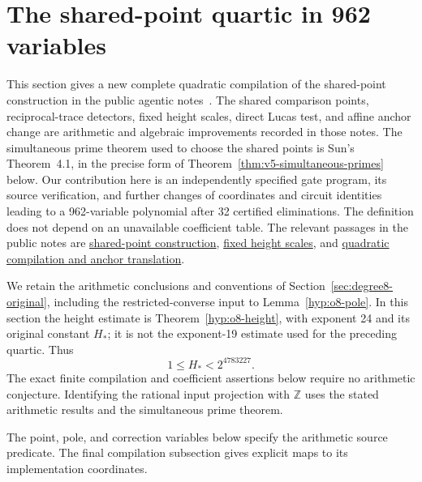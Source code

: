 \documentclass[11pt]{article}
\theoremstyle{definition}
\theoremstyle{remark}
\newcommand{\Z}{\mathbb Z}
\begin{document}
\section{The shared-point quartic in 962 variables}
\label{sec:v6-962}

This section gives a new complete quadratic compilation of the shared-point
construction in the public agentic notes~\cite{agentic-improvements}.
The shared comparison points, reciprocal-trace detectors, fixed height
scales, direct Lucas test, and affine anchor change are arithmetic
and algebraic improvements recorded in those notes. The simultaneous prime theorem used to choose
the shared points is Sun's Theorem~4.1, in the precise form of
Theorem~\ref{thm:v5-simultaneous-primes} below. Our contribution here is an
independently specified gate program, its source verification, and
further changes of coordinates and circuit identities leading to a
962-variable polynomial after 32 certified eliminations. The
definition does not depend on an unavailable coefficient table.
The relevant passages in the public notes are
\href{https://github.com/JoseBrox/diophantine-z-q_improvements/blob/f4d1b5e6c23d4adeb3ae1f986ab0bf87884bdff6/paper/diophantine_optimization_20261106_v3.tex#L2354-L3044}{shared-point construction},
\href{https://github.com/JoseBrox/diophantine-z-q_improvements/blob/f4d1b5e6c23d4adeb3ae1f986ab0bf87884bdff6/paper/diophantine_optimization_20261106_v3.tex#L3352-L3405}{fixed height scales},
and
\href{https://github.com/JoseBrox/diophantine-z-q_improvements/blob/f4d1b5e6c23d4adeb3ae1f986ab0bf87884bdff6/paper/diophantine_optimization_20261106_v3.tex#L4135-L4758}{quadratic compilation and anchor translation}.

We retain the arithmetic conclusions and conventions of
Section~\ref{sec:degree8-original}, including the restricted-converse
input to Lemma~\ref{hyp:o8-pole}. In this section the height estimate is
Theorem~\ref{hyp:o8-height}, with exponent 24 and its original constant
$H_*$; it is not the exponent-19 estimate used for the preceding quartic.
Thus
\[
  1\le H_*<2^{4783227}.
\]
The exact finite compilation and coefficient assertions below require no
arithmetic conjecture. Identifying the rational input projection with
$\Z$ uses the stated arithmetic results and the simultaneous prime theorem.

The point, pole, and correction variables below specify the
arithmetic source predicate. The final compilation subsection
gives explicit maps to its implementation coordinates.
\end{document}
